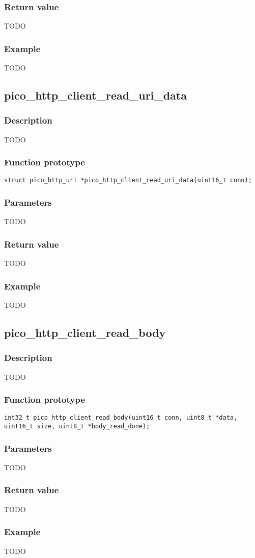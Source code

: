 \subsubsection*{Return value}
TODO
\subsubsection*{Example}
TODO


\subsection{pico\_http\_client\_read\_uri\_data}

\subsubsection*{Description}
TODO

\subsubsection*{Function prototype}
\texttt{struct pico\_http\_uri *pico\_http\_client\_read\_uri\_data(uint16\_t conn);}

\subsubsection*{Parameters}
TODO
\subsubsection*{Return value}
TODO
\subsubsection*{Example}
TODO


\subsection{pico\_http\_client\_read\_body}

\subsubsection*{Description}
TODO

\subsubsection*{Function prototype}
\texttt{int32\_t pico\_http\_client\_read\_body(uint16\_t conn, uint8\_t *data, uint16\_t size, uint8\_t *body\_read\_done);}

\subsubsection*{Parameters}
TODO
\subsubsection*{Return value}
TODO
\subsubsection*{Example}
TODO
